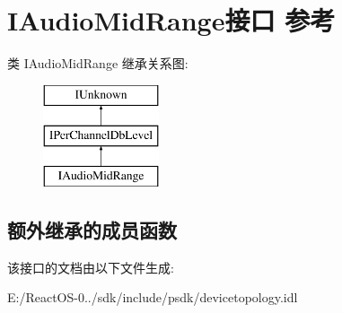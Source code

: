 \hypertarget{interface_i_audio_mid_range}{}\section{I\+Audio\+Mid\+Range接口 参考}
\label{interface_i_audio_mid_range}
类 I\+Audio\+Mid\+Range 继承关系图\+:\begin{figure}[H]
\begin{center}
\leavevmode
\includegraphics[height=3.000000cm]{interface_i_audio_mid_range}
\end{center}
\end{figure}
\subsection*{额外继承的成员函数}


该接口的文档由以下文件生成\+:\begin{DoxyCompactItemize}
\item 
E\+:/\+React\+O\+S-\/0../sdk/include/psdk/devicetopology.\+idl\end{DoxyCompactItemize}
